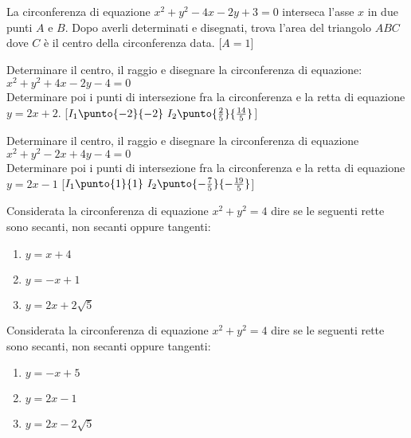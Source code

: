 \begin{esercizio}\label{ese:}
La circonferenza di equazione \(x^2+y^2-4x-2y+3=0\) interseca l’asse \(x\) 
in due punti \(A\) e \(B\). Dopo averli determinati e disegnati, trova 
l’area del triangolo \(ABC\) dove \(C\) è il centro della circonferenza 
data.
\hfill[\(A=1\)]
\end{esercizio}

\begin{esercizio}\label{ese:}
Determinare il centro, il raggio e disegnare la circonferenza di 
equazione:\\
\(x^2+y^2+4x-2y-4=0\)\\
Determinare poi i punti di intersezione fra la circonferenza e la retta di 
equazione \(y=2x+2\).
\hfill [\(I_1\punto{-2}{-2}~I_2\punto{\frac{2}{5}}{\frac{14}{5}}\)]
\end{esercizio}

\begin{esercizio}\label{ese:}
Determinare il centro, il raggio e disegnare la circonferenza di equazione\\
\(x^2+y^2-2x+4y-4=0\)\\
Determinare poi i punti di intersezione fra la circonferenza e la retta di 
equazione \(y=2x-1\) 
\hfill [\(I_1\punto{1}{1}~I_2\punto{-\frac{7}{5}}{-\frac{19}{5}}\)]
\end{esercizio}

\begin{esercizio}\label{ese:}
Considerata la circonferenza di equazione \(x^2 +y^2 = 4\) dire se le seguenti 
rette sono secanti, non secanti oppure tangenti:
\begin{multicols}{3}
\begin{enumerate} [label=\alph*), nosep]
 \item \(y=x+4\)
 \item \(y=-x+1\)
 \item \(y=2x+2\sqrt{5}\)
\end{enumerate}
\end{multicols}
\end{esercizio}

\begin{esercizio}\label{ese:}
Considerata la circonferenza di equazione \(x^2 +y^2 = 4\) dire se le seguenti 
rette sono secanti, non secanti oppure tangenti:
\begin{multicols}{3}
\begin{enumerate} [label=\alph*), nosep]
 \item \(y=-x+5\)
 \item \(y=2x-1\)
 \item \(y=2x-2\sqrt{5}\)
\end{enumerate}
\end{multicols}
\end{esercizio}

